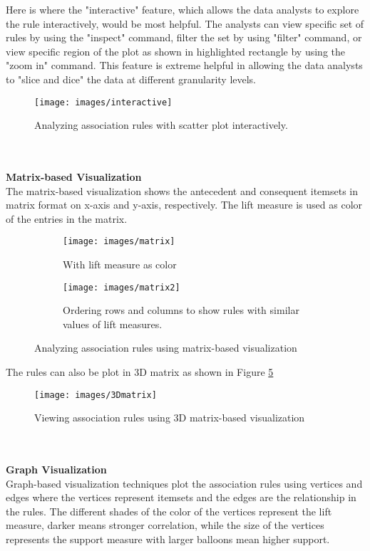 \documentclass{article}
\begin{document}
Here is where the "interactive" feature, which allows the data analysts to explore the rule interactively, would be most helpful. The analysts can view specific set of rules by using the "inspect" command, filter the set by using "filter" command, or view specific region of the plot as shown in highlighted rectangle by using the "zoom in" command.  This feature is extreme helpful in allowing the data analysts to "slice and dice" the data at different granularity levels.
\begin{figure}[h!]
  \centering
    \texttt{[image: images/interactive]}
    \caption{Analyzing association rules with scatter plot interactively.}
    \label{fig:interactive}
\end{figure}
\\\\
\textbf{Matrix-based Visualization}\\
The matrix-based visualization shows the antecedent and consequent itemsets in matrix format on x-axis and y-axis, respectively.  The lift measure is used as color of the entries in the matrix.   

\begin{figure}[h!]
\begin{subfigure}{.5\textwidth}
  \centering
  \texttt{[image: images/matrix]}
  \caption{With lift measure as color}
  \label{fig:matrix}
\end{subfigure}%
\begin{subfigure}{.5\textwidth}
  \centering
  \texttt{[image: images/matrix2]}
  \caption{Ordering rows and columns to show rules with similar values of lift measures.}
  \label{fig:sorted_matrix}
\end{subfigure}
\caption{Analyzing association rules using matrix-based visualization}
\end{figure}

The rules can also be plot in 3D matrix as shown in Figure \ref{fig:3Dmatrix}
\begin{figure}[h!]
  \centering
    \texttt{[image: images/3Dmatrix]}
    \caption{Viewing association rules using 3D matrix-based visualization}
    \label{fig:3Dmatrix}
\end{figure}
\\\\
\textbf{Graph Visualization}\\
Graph-based visualization techniques plot the association rules using vertices and edges where the vertices represent itemsets and the edges are the relationship in the rules.  The different shades of the color of the vertices represent the lift measure, darker means stronger correlation, while the size of the vertices represents the support measure with larger balloons mean higher support.  
\end{document}
